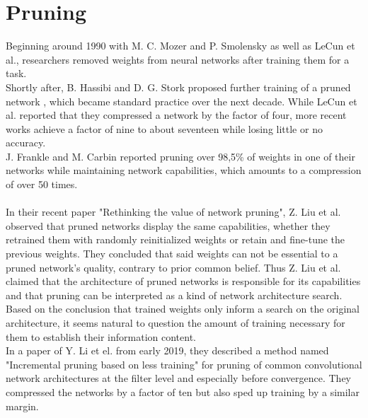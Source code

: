 \section{Pruning}
Beginning around 1990 with M. C. Mozer and P. Smolensky as well as LeCun et al., researchers removed weights from neural networks after training them for a task.\cite{Skeletonization}\cite{Optimal-Brain-Damage}\\  Shortly after, B. Hassibi and D. G. Stork proposed further training of a pruned network \cite{Optimal-Brain-Surgeon}, which became standard practice over the next decade. While LeCun et al. reported that they compressed a network by the factor of four, more recent works achieve a factor of nine to about seventeen while losing little or no accuracy.\cite{Learning_Weights_And_Connections}\cite{ThiNet}\\
J. Frankle and M. Carbin reported pruning over 98,5\% of weights in one of their networks while maintaining network capabilities, which amounts to a compression of over 50 times.\cite{LTH}\\
\\
In their recent paper "Rethinking the value of network pruning", Z. Liu et al. observed that pruned networks display the same capabilities, whether they retrained them with randomly reinitialized weights or retain and fine-tune the previous weights. They concluded that said weights can not be essential to a pruned network's quality, contrary to prior common belief. Thus Z. Liu et al. claimed that the architecture of pruned networks is responsible for its capabilities and that pruning can be interpreted as a kind of network architecture search.\cite{Rethinking-Network-Pruning}\\
Based on the conclusion that trained weights only inform a search on the original architecture, it seems natural to question the amount of training necessary for them to establish their information content.\\
In a paper of Y. Li et el. from early 2019, they described a method named "Incremental pruning based on less training" for pruning of common convolutional network architectures at the filter level and especially before convergence. They compressed the networks by a factor of ten but also sped up training by a similar margin.\cite{Pruning-With-Little-Training}

